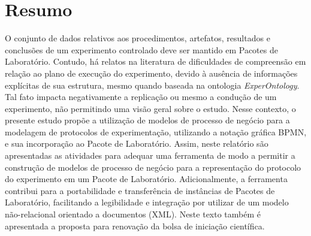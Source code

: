 \chapter*{Resumo}


O conjunto de dados  relativos aos procedimentos, artefatos, resultados e conclusões de um experimento controlado deve ser mantido em Pacotes de Laboratório. Contudo, há relatos na literatura de dificuldades de compreensão em relação ao plano de execução do experimento, devido à ausência de informações explícitas de sua estrutura, mesmo quando baseada na ontologia \textit{ExperOntology}. Tal fato impacta negativamente a replicação ou mesmo a condução de um experimento, não permitindo uma visão geral sobre o estudo. Nesse contexto, o presente estudo propõe a utilização de modelos de processo de negócio para a modelagem de protocolos de experimentação, utilizando a notação gráfica BPMN, e sua incorporação ao Pacote de Laboratório. Assim, neste relatório são apresentadas as atividades para adequar  uma ferramenta de modo a permitir a construção de modelos de processo de negócio para a representação do protocolo do experimento em um Pacote de Laboratório. Adicionalmente, a ferramenta contribui para a portabilidade e transferência de instâncias de Pacotes de Laboratório, facilitando a legibilidade e integração por  utilizar de um modelo não-relacional orientado a documentos (XML). Neste texto também é apresentada a proposta para renovação da bolsa de iniciação científica.